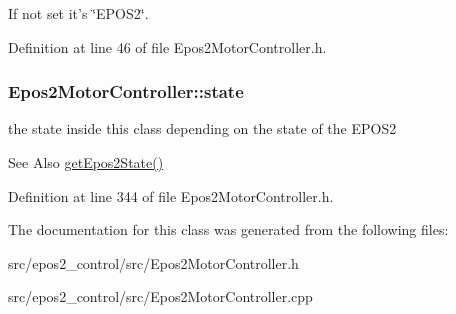 If not set it's \char`\"{}\-E\-P\-O\-S2\char`\"{}. 

Definition at line 46 of file Epos2\-Motor\-Controller.\-h.

\hypertarget{classEpos2MotorController_a7194b8efd4f2fd5a4d64b10135c416e2}{
\subsubsection[{state}]{ Epos2\-Motor\-Controller\-::state\hspace{0.3cm}{\ttfamily [private]}}}\label{classEpos2MotorController_a7194b8efd4f2fd5a4d64b10135c416e2}


the state inside this class depending on the state of the E\-P\-O\-S2 

\begin{DoxySeeAlso}{See Also}
\hyperlink{classEpos2MotorController_ac6c31e0dc57485aa817431b22627fc70}{get\-Epos2\-State()} 
\end{DoxySeeAlso}


Definition at line 344 of file Epos2\-Motor\-Controller.\-h.



The documentation for this class was generated from the following files\-:\begin{DoxyCompactItemize}
\item 
src/epos2\-\_\-control/src/Epos2\-Motor\-Controller.\-h\item 
src/epos2\-\_\-control/src/Epos2\-Motor\-Controller.\-cpp\end{DoxyCompactItemize}
